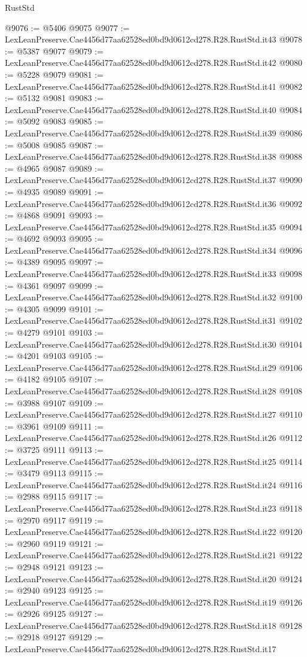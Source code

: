 \begin{lexlean}{RustStd}
\begin{coremodule}
@9076 := @5406 @9075
@9077 := LexLeanPreserve.Cae4456d77aa62528ed0bd9d0612cd278.R28.RustStd.it43
@9078 := @5387 @9077
@9079 := LexLeanPreserve.Cae4456d77aa62528ed0bd9d0612cd278.R28.RustStd.it42
@9080 := @5228 @9079
@9081 := LexLeanPreserve.Cae4456d77aa62528ed0bd9d0612cd278.R28.RustStd.it41
@9082 := @5132 @9081
@9083 := LexLeanPreserve.Cae4456d77aa62528ed0bd9d0612cd278.R28.RustStd.it40
@9084 := @5092 @9083
@9085 := LexLeanPreserve.Cae4456d77aa62528ed0bd9d0612cd278.R28.RustStd.it39
@9086 := @5008 @9085
@9087 := LexLeanPreserve.Cae4456d77aa62528ed0bd9d0612cd278.R28.RustStd.it38
@9088 := @4965 @9087
@9089 := LexLeanPreserve.Cae4456d77aa62528ed0bd9d0612cd278.R28.RustStd.it37
@9090 := @4935 @9089
@9091 := LexLeanPreserve.Cae4456d77aa62528ed0bd9d0612cd278.R28.RustStd.it36
@9092 := @4868 @9091
@9093 := LexLeanPreserve.Cae4456d77aa62528ed0bd9d0612cd278.R28.RustStd.it35
@9094 := @4692 @9093
@9095 := LexLeanPreserve.Cae4456d77aa62528ed0bd9d0612cd278.R28.RustStd.it34
@9096 := @4389 @9095
@9097 := LexLeanPreserve.Cae4456d77aa62528ed0bd9d0612cd278.R28.RustStd.it33
@9098 := @4361 @9097
@9099 := LexLeanPreserve.Cae4456d77aa62528ed0bd9d0612cd278.R28.RustStd.it32
@9100 := @4305 @9099
@9101 := LexLeanPreserve.Cae4456d77aa62528ed0bd9d0612cd278.R28.RustStd.it31
@9102 := @4279 @9101
@9103 := LexLeanPreserve.Cae4456d77aa62528ed0bd9d0612cd278.R28.RustStd.it30
@9104 := @4201 @9103
@9105 := LexLeanPreserve.Cae4456d77aa62528ed0bd9d0612cd278.R28.RustStd.it29
@9106 := @4182 @9105
@9107 := LexLeanPreserve.Cae4456d77aa62528ed0bd9d0612cd278.R28.RustStd.it28
@9108 := @3988 @9107
@9109 := LexLeanPreserve.Cae4456d77aa62528ed0bd9d0612cd278.R28.RustStd.it27
@9110 := @3961 @9109
@9111 := LexLeanPreserve.Cae4456d77aa62528ed0bd9d0612cd278.R28.RustStd.it26
@9112 := @3725 @9111
@9113 := LexLeanPreserve.Cae4456d77aa62528ed0bd9d0612cd278.R28.RustStd.it25
@9114 := @3479 @9113
@9115 := LexLeanPreserve.Cae4456d77aa62528ed0bd9d0612cd278.R28.RustStd.it24
@9116 := @2988 @9115
@9117 := LexLeanPreserve.Cae4456d77aa62528ed0bd9d0612cd278.R28.RustStd.it23
@9118 := @2970 @9117
@9119 := LexLeanPreserve.Cae4456d77aa62528ed0bd9d0612cd278.R28.RustStd.it22
@9120 := @2960 @9119
@9121 := LexLeanPreserve.Cae4456d77aa62528ed0bd9d0612cd278.R28.RustStd.it21
@9122 := @2948 @9121
@9123 := LexLeanPreserve.Cae4456d77aa62528ed0bd9d0612cd278.R28.RustStd.it20
@9124 := @2940 @9123
@9125 := LexLeanPreserve.Cae4456d77aa62528ed0bd9d0612cd278.R28.RustStd.it19
@9126 := @2926 @9125
@9127 := LexLeanPreserve.Cae4456d77aa62528ed0bd9d0612cd278.R28.RustStd.it18
@9128 := @2918 @9127
@9129 := LexLeanPreserve.Cae4456d77aa62528ed0bd9d0612cd278.R28.RustStd.it17

\end{coremodule}
\end{lexlean}
